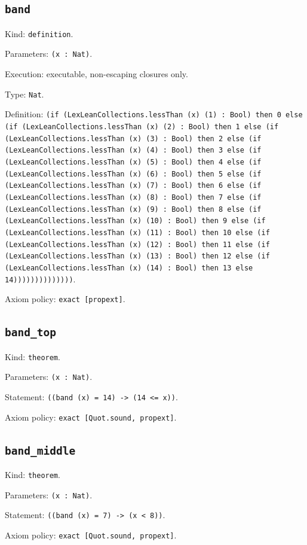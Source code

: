 \documentclass[11pt]{article}
\begin{document}
\subsection*{\texttt{band}}
\noindent Kind: \texttt{definition}.\par
\noindent Parameters: \texttt{(x : Nat)}.\par
\noindent Execution: executable, non-escaping closures only.\par
\noindent Type: \texttt{Nat}.\par
\noindent Definition: \texttt{(if (LexLeanCollections.lessThan (x) (1) : Bool) then 0 else (if (LexLeanCollections.lessThan (x) (2) : Bool) then 1 else (if (LexLeanCollections.lessThan (x) (3) : Bool) then 2 else (if (LexLeanCollections.lessThan (x) (4) : Bool) then 3 else (if (LexLeanCollections.lessThan (x) (5) : Bool) then 4 else (if (LexLeanCollections.lessThan (x) (6) : Bool) then 5 else (if (LexLeanCollections.lessThan (x) (7) : Bool) then 6 else (if (LexLeanCollections.lessThan (x) (8) : Bool) then 7 else (if (LexLeanCollections.lessThan (x) (9) : Bool) then 8 else (if (LexLeanCollections.lessThan (x) (10) : Bool) then 9 else (if (LexLeanCollections.lessThan (x) (11) : Bool) then 10 else (if (LexLeanCollections.lessThan (x) (12) : Bool) then 11 else (if (LexLeanCollections.lessThan (x) (13) : Bool) then 12 else (if (LexLeanCollections.lessThan (x) (14) : Bool) then 13 else 14))))))))))))))}.\par
\noindent Axiom policy: \texttt{exact [propext]}.\par
\subsection*{\texttt{band\_top}}
\noindent Kind: \texttt{theorem}.\par
\noindent Parameters: \texttt{(x : Nat)}.\par
\noindent Statement: \texttt{((band (x) = 14) -> (14 <= x))}.\par
\noindent Axiom policy: \texttt{exact [Quot.sound, propext]}.\par
\subsection*{\texttt{band\_middle}}
\noindent Kind: \texttt{theorem}.\par
\noindent Parameters: \texttt{(x : Nat)}.\par
\noindent Statement: \texttt{((band (x) = 7) -> (x < 8))}.\par
\noindent Axiom policy: \texttt{exact [Quot.sound, propext]}.\par
\end{document}
